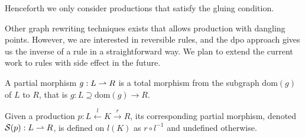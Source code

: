 Henceforth we only consider productions that satisfy the gluing condition.

\begin{remark}
Other graph rewriting techniques exists that allows production with dangling points. However, we are interested in reversible rules, and the dpo approach gives us the inverse of a rule in a straightforward way. We plan to extend the current work to rules with side effect in the future.
\end{remark}

\begin{definition}
  A partial morphism $g:L \rightharpoonup R$ is a total morphism from the subgraph $\text{dom}(g)$ of $L$ to $R$, that is $g:L \supseteq \text{dom}(g) \to R$.
\end{definition}

\begin{definition}
  Given a production $p:L\overset{l}{\leftarrow} K \overset{r}{\rightarrow} R$, its corresponding partial morphism, denoted $\mathcal{S}(p):L\rightharpoonup R$, is defined on $l(K)$ as $r\circ l^{-1}$ and undefined otherwise.
\end{definition}
